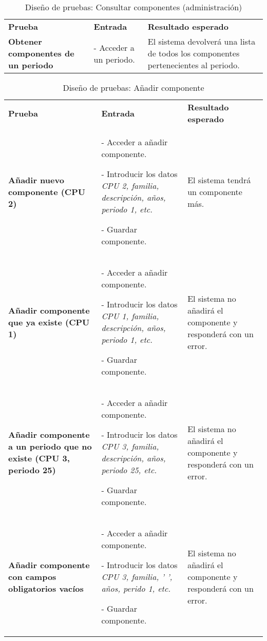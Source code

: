 \begin{table}[H]
\vspace{-4mm}
  \centering
  \caption{Diseño de pruebas: Consultar componentes (administración)}
    \begin{tabular}{p{11em}p{11em}p{14em}}
    \toprule
    \rowcolor[rgb]{ .851,  .886,  .953} \multicolumn{3}{p{36em}}{\textbf{Consultar componentes (administración)}} \\ \midrule
    \rowcolor[rgb]{ .949,  .949,  .949} \textbf{Prueba} & \textbf{Entrada} & \textbf{Resultado esperado}\\ \midrule
    \textbf{Obtener componentes de un periodo} & - Acceder a un periodo. & El sistema devolverá una lista de todos los componentes pertenecientes al periodo. \\ \bottomrule
    \end{tabular}%
\end{table}%
\begin{table}[H]
\vspace{-4mm}
  \centering
  \caption{Diseño de pruebas: Añadir componente}
    \begin{tabular}{p{13em}p{15em}p{8em}}
    \toprule
    \rowcolor[rgb]{ .851,  .886,  .953} \multicolumn{3}{p{36em}}{\textbf{Añadir componente}} \\ \midrule
    \rowcolor[rgb]{ .949,  .949,  .949} \textbf{Prueba} & \textbf{Entrada} & \textbf{Resultado esperado}\\ \midrule
    \textbf{Añadir nuevo componente (CPU 2)} & - Acceder a añadir componente. \par - Introducir los datos \textit{CPU 2, familia, descripción, años, periodo 1, etc.}\par - Guardar componente. & El sistema tendrá un componente más. \\ \midrule
    \textbf{Añadir componente que ya existe (CPU 1)} & - Acceder a añadir componente. \par - Introducir los datos \textit{CPU 1, familia, descripción, años, periodo 1, etc.}\par - Guardar componente.  & El sistema no añadirá el componente y responderá con un error.  \\ \midrule
    \textbf{Añadir componente a un periodo que no existe (CPU 3, periodo 25)} & - Acceder a añadir componente. \par - Introducir los datos \textit{CPU 3, familia, descripción, años, periodo 25, etc.}\par - Guardar componente.  & El sistema no añadirá el componente y responderá con un error.  \\ \midrule
    \textbf{Añadir componente con campos obligatorios vacíos} & - Acceder a añadir componente. \par - Introducir los datos \textit{CPU 3, familia, ' ', años, perido 1, etc.}\par - Guardar componente.  & El sistema no añadirá el componente y responderá con un error. \\ \bottomrule
    \end{tabular}%
\end{table}%
